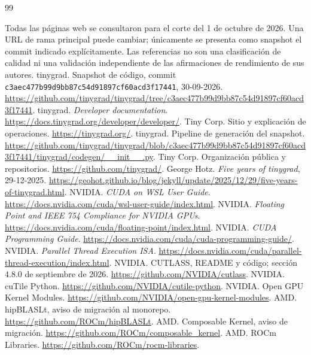 \renewcommand{\bibname}{Bibliografía y recursos verificables}
\begin{thebibliography}{99}
\item[] Todas las páginas web se consultaron para el corte del 1 de octubre de 2026. Una URL de rama principal puede cambiar; únicamente se presenta como snapshot el commit indicado explícitamente. Las referencias no son una clasificación de calidad ni una validación independiente de las afirmaciones de rendimiento de sus autores.
 tinygrad. Snapshot de código, commit \texttt{c3aec477b99d9\allowbreak{}bb87c54d91897\allowbreak{}cf60acd3f17441}, 30-09-2026. \url{https://github.com/tinygrad/tinygrad/tree/c3aec477b99d9bb87c54d91897cf60acd3f17441}.
 tinygrad. \emph{Developer documentation}. \url{https://docs.tinygrad.org/developer/developer/}.
 Tiny Corp. Sitio y explicación de operaciones. \url{https://tinygrad.org/}.
 tinygrad. Pipeline de generación del snapshot. \url{https://github.com/tinygrad/tinygrad/blob/c3aec477b99d9bb87c54d91897cf60acd3f17441/tinygrad/codegen/__init__.py}.
 Tiny Corp. Organización pública y repositorios. \url{https://github.com/tinygrad/}.
 George Hotz. \emph{Five years of tinygrad}, 29-12-2025. \url{https://geohot.github.io/blog/jekyll/update/2025/12/29/five-years-of-tinygrad.html}.
 NVIDIA. \emph{CUDA on WSL User Guide}. \url{https://docs.nvidia.com/cuda/wsl-user-guide/index.html}.
 NVIDIA. \emph{Floating Point and IEEE 754 Compliance for NVIDIA GPUs}. \url{https://docs.nvidia.com/cuda/floating-point/index.html}.
 NVIDIA. \emph{CUDA Programming Guide}. \url{https://docs.nvidia.com/cuda/cuda-programming-guide/}.
 NVIDIA. \emph{Parallel Thread Execution ISA}. \url{https://docs.nvidia.com/cuda/parallel-thread-execution/index.html}.
 NVIDIA. CUTLASS, README y código; sección 4.8.0 de septiembre de 2026. \url{https://github.com/NVIDIA/cutlass}.
 NVIDIA. cuTile Python. \url{https://github.com/NVIDIA/cutile-python}.
 NVIDIA. Open GPU Kernel Modules. \url{https://github.com/NVIDIA/open-gpu-kernel-modules}.
 AMD. hipBLASLt, aviso de migración al monorepo. \url{https://github.com/ROCm/hipBLASLt}.
 AMD. Composable Kernel, aviso de migración. \url{https://github.com/ROCm/composable_kernel}.
 AMD. ROCm Libraries. \url{https://github.com/ROCm/rocm-libraries}.

\end{thebibliography}
